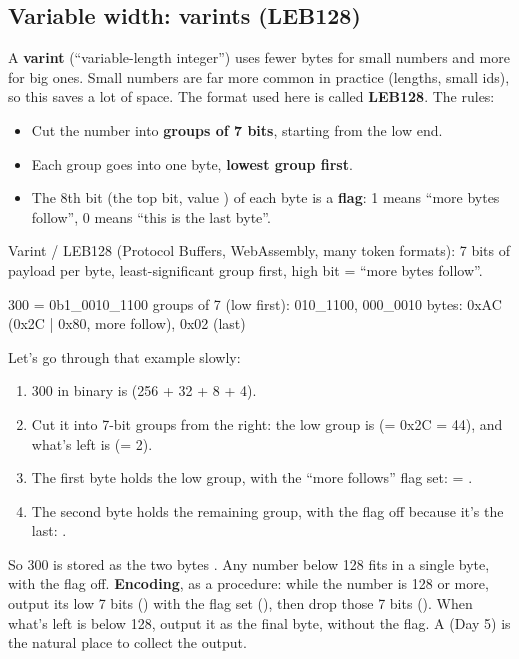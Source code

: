 \documentclass[10pt,a4paper]{article}
\begin{document}
\subsection{Variable width: varints (LEB128)}
A \textbf{varint} (“variable-length integer”) uses fewer bytes for small numbers and more for big ones. Small numbers are far more common in practice (lengths, small ids), so this saves a lot of space. The format used here is called \textbf{LEB128}.
The rules:
\begin{itemize}
\item Cut the number into \textbf{groups of 7 bits}, starting from the low end.
\item Each group goes into one byte, \textbf{lowest group first}.
\item The 8th bit (the top bit, value ) of each byte is a \textbf{flag}: 1 means “more bytes follow”, 0 means “this is the last byte”.
\end{itemize}
Varint / LEB128 (Protocol Buffers, WebAssembly, many token formats): 7 bits of payload per byte, least-significant group first, high bit  = “more bytes follow”.
\begin{txtcode}
300 = 0b1_0010_1100
groups of 7 (low first): 010_1100, 000_0010
bytes: 0xAC (0x2C | 0x80, more follow), 0x02 (last)
\end{txtcode}
Let’s go through that example slowly:
\begin{enumerate}
\item 300 in binary is  (256 + 32 + 8 + 4).
\item Cut it into 7-bit groups from the right: the low group is  (= 0x2C = 44), and what’s left is  (= 2).
\item The first byte holds the low group, with the “more follows” flag set:  = .
\item The second byte holds the remaining group, with the flag off because it’s the last: .
\end{enumerate}
So 300 is stored as the two bytes . Any number below 128 fits in a single byte, with the flag off.
\textbf{Encoding}, as a procedure: while the number is 128 or more, output its low 7 bits () with the flag set (), then drop those 7 bits (). When what’s left is below 128, output it as the final byte, without the flag. A  (Day 5) is the natural place to collect the output.
\end{document}
